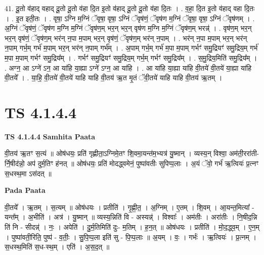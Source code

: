 \documentclass[17pt]{extarticle}
\begin{document}
41. दू॒तो व॑हाद् वहाद् दू॒तो दू॒तो व॑हा दि॒त इ॒तो व॑हाद् दू॒तो दू॒तो व॑हा दि॒तः । . व॒हा॒ दि॒त इ॒तो व॑हाद् वहा दि॒तः । . इ॒त इती॒तः । . वृषा॒ ऽग्नि म॒ग्निं ॅवृषा॒ वृषा॒ ऽग्निं ॅवृष॑णं॒ ॅवृष॑ण म॒ग्निं ॅवृषा॒ वृषा॒ ऽग्निं ॅवृष॑णम् । . अ॒ग्निं ॅवृष॑णं॒ ॅवृष॑ण म॒ग्नि म॒ग्निं ॅवृष॑ण॒म् भर॒न् भर॒न् वृष॑ण म॒ग्नि म॒ग्निं ॅवृष॑ण॒म् भरन्न्॑ । . वृष॑ण॒म् भर॒न् भर॒न् वृष॑णं॒ ॅवृष॑ण॒म् भर॑न् न॒पा म॒पाम् भर॒न् वृष॑णं॒ ॅवृष॑ण॒म् भर॑न् न॒पाम् । . भर॑न् न॒पा म॒पाम् भर॒न् भर॑न् न॒पाम् गर्भ॒म् गर्भ॑ म॒पाम् भर॒न् भर॑न् न॒पाम् गर्भ᳚म् । . अ॒पाम् गर्भ॒म् गर्भ॑ म॒पा म॒पाम् गर्भꣳ॑ समु॒द्रियꣳ॑ समु॒द्रिय॒म् गर्भ॑ म॒पा म॒पाम् गर्भꣳ॑ समु॒द्रिय᳚म् । . गर्भꣳ॑ समु॒द्रियꣳ॑ समु॒द्रिय॒म् गर्भ॒म् गर्भꣳ॑ समु॒द्रिय᳚म् । . स॒मु॒द्रिय॒मिति॑ समु॒द्रिय᳚म् । . अग्न॒ आ ऽग्ने॑ ऽन॒ आ या॑हि या॒ह्या ऽग्ने॑ ऽग्न॒ आ या॑हि । . आ या॑हि या॒ह्या या॑हि वी॒तये॑ वी॒तये॑ या॒ह्या या॑हि वी॒तये᳚ । . या॒हि॒ वी॒तये॑ वी॒तये॑ याहि याहि वी॒तय॑ ऋ॒त मृ॒तं ॅवी॒तये॑ याहि याहि वी॒तय॑ ऋ॒तम् । \newline
\pagebreak
{}

\section{ TS 4.1.4.4 }

\textbf{TS 4.1.4.4 } \newline
\textbf{Samhita Paata} \newline

वी॒तय॑ ऋ॒तꣳ स॒त्यं ॥ ओष॑धयः॒ प्रति॑ गृह्णीता॒ऽग्निमे॒तꣳ शि॒वमा॒यन्त॑म॒भ्यत्र॑ यु॒ष्मान् । व्यस्य॒न् विश्वा॒ अम॑ती॒ररा॑ती-र्नि॒षीद॑न्नो॒ अप॑ दुर्म॒तिꣳ ह॑नत् ॥ ओष॑धयः॒ प्रति॑ मोदद्ध्वमेनं॒ पुष्पा॑वतीः सुपिप्प॒लाः । अ॒यं ॅवो॒ गर्भ॑ ऋ॒त्वियः॑ प्र॒त्नꣳ स॒धस्थ॒मा ऽस॑दत् ॥ \newline

\textbf{Pada Paata} \newline

वी॒तये᳚ । ऋ॒तम् । स॒त्यम् ॥ ओष॑धयः । प्रतीति॑ । गृ॒ह्णी॒त॒ । अ॒ग्निम् । ए॒तम् । शि॒वम् । आ॒यन्त॒मित्या᳚ - यन्त᳚म् । अ॒भीति॑ । अत्र॑ । यु॒ष्मान् ॥ व्यस्य॒न्निति॑ वि - अस्यन्न्॑ । विश्वाः᳚ । अम॑तीः । अरा॑तीः । नि॒षीद॒न्नि ति॑ नि - सीदन्न्॑ । नः॒ । अपेति॑ । दु॒र्म॒तिमिति॑ दुः- म॒तिम् । ह॒न॒त् ॥ ओष॑धयः । प्रतीति॑ । मो॒द॒द्ध्व॒म् । ए॒न॒म् । पुष्पा॑वती॒रिति॒ पुष्प॑ - व॒तीः॒ । सु॒पि॒प्प॒ला इति॑ सु - पि॒प्प॒लाः ॥ अ॒यम् । वः॒ । गर्भः॑ । ऋ॒त्वियः॑ । प्र॒त्नम् । स॒धस्थ॒मिति॑ स॒ध-स्थ॒म् । एति॑ । अ॒स॒द॒त् ॥  \newline
\end{document}

